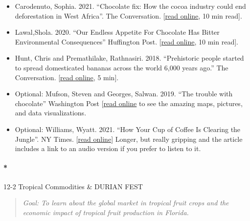 \documentclass[
  10pt,
  letterpaper,
  oneside,
  open=any]{scrbook}
\let\oldparagraph\paragraph
\renewcommand{\paragraph}[1]{\oldparagraph{#1}\mbox{}}
\begin{document}
\begin{itemize}
\item
  Carodenuto, Sophia. 2021. ``Chocolate fix: How the cocoa industry
  could end deforestation in West Africa''. The Conversation.
  {[}\href{https://theconversation.com/chocolate-fix-how-the-cocoa-industry-could-end-deforestation-in-west-africa-161953}{read
  online}, 10 min read{]}.
\item
  Lawal,Shola. 2020. ``Our Endless Appetite For Chocolate Has Bitter
  Environmental Consequences'' Huffington Post.
  {[}\href{https://tinyurl.com/y6curgmn}{read online}, 10 min read{]}.
\item
  Hunt, Chris and Premathilake, Rathnasiri. 2018. ``Prehistoric people
  started to spread domesticated bananas across the world 6,000 years
  ago.'' The Conversation.
  {[}\href{https://theconversation.com/prehistoric-people-started-to-spread-domesticated-bananas-across-the-world-6-000-years-ago-99547}{read
  online}, 5 min{]}.
\item
  Optional: Mufson, Steven and Georges, Salwan. 2019. ``The trouble with
  chocolate'' Washington Post
  {[}\href{https://www.washingtonpost.com/graphics/2019/national/climate-environment/mars-chocolate-deforestation-climate-change-west-africa/}{read
  online} to see the amazing maps, pictures, and data visualizations.
\item
  Optional: Williams, Wyatt. 2021. ``How Your Cup of Coffee Is Clearing
  the Jungle''. NY Times.
  {[}\href{https://www.nytimes.com/2021/08/11/magazine/indonesia-rainforest-coffee.html}{read
  online}{]} Longer, but really gripping and the article includes a link
  to an audio version if you prefer to listen to it.
\end{itemize}

\paragraph*{12-2 Tropical Commodities \& DURIAN
FEST}\label{tropical-commodities-durian-fest}

\begin{quote}
\emph{Goal: To learn about the global market in tropical fruit crops and
the economic impact of tropical fruit production in Florida.}
\end{quote}
\end{document}
